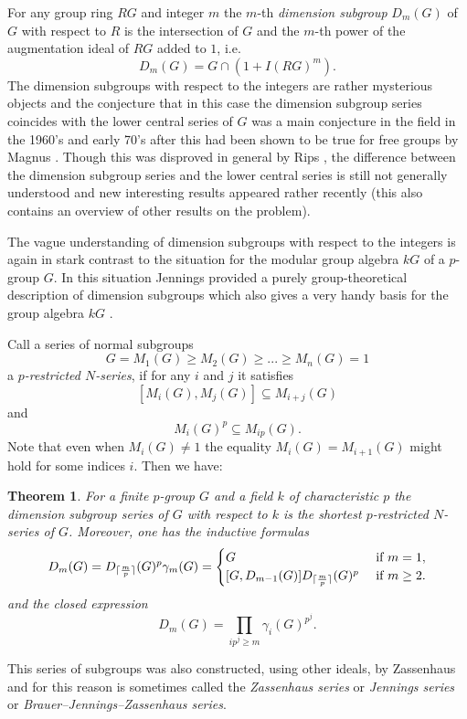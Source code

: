 \documentclass[11pt, a4paper]{amsart}
\newtheorem{theorem}{Theorem}[section]
\theoremstyle{definition}
\DeclarePairedDelimiter{\ceil}{\lceil}{\rceil}
\begin{document}
For any group ring $RG$ and integer $m$ the $m$-th \emph{dimension subgroup} $D_m(G)$ of $G$ with respect to $R$ is the intersection of $G$ and the $m$-th power of the augmentation ideal of $RG$ added to $1$, i.e.\
\[D_m(G) = G \cap (1+I(RG)^m). \]
The dimension subgroups with respect to the integers are rather mysterious objects and the conjecture that in this case the dimension subgroup series coincides with the lower central series of $G$ was a main conjecture in the field in the 1960's and early 70's after this had been shown to be true for free groups by Magnus \cite{Magnus35}. Though this was disproved in general by Rips \cite{Rips72}, the difference between the dimension subgroup series and the lower central series is still not generally understood and new interesting results appeared rather recently \cite{BartholdiMikhailov} (this also contains an overview of other results on the problem).

The vague understanding of dimension subgroups with respect to the integers is again in stark contrast to the situation for the modular group algebra $kG$ of a $p$-group $G$. In this situation Jennings provided a purely group-theoretical description of dimension subgroups which also gives a very handy basis for the group algebra $kG$ \cite{Jennings41}.

Call a series of normal subgroups
\[G = M_1(G) \geq M_2(G) \geq ... \geq M_n(G) = 1 \]
a \emph{$p$-restricted $N$-series}, if for any $i$ and $j$ it satisfies
\[[M_i(G), M_j(G)] \subseteq M_{i+j}(G) \]
and
\[M_i(G)^p \subseteq M_{ip}(G). \]
Note that even when $M_i(G) \neq 1$ the equality $M_i(G) = M_{i+1}(G)$ might hold for some indices $i$. Then we have:

\begin{theorem}\cite{Jennings41, Lazard54} 
For a finite $p$-group $G$ and a field $k$ of characteristic $p$ the dimension subgroup series of $G$ with respect to $k$ is the shortest $p$-restricted $N$-series of $G$. Moreover, one has the inductive formulas 
\[D_m(G) = D_{\ceil{\frac{m}{p}}}(G)^p \gamma_m(G) = \begin{cases}
G & \textup{ if } m=1, \\
[G,D_{m-1}(G)]D_{\ceil{\frac{m}{p}}}(G)^p & \textup{ if } m\geq 2.
\end{cases}\]
and the closed expression
\[D_m(G) = \prod_{ip^j \geq m} \gamma_i(G)^{p^j} . \]
\end{theorem}
This series of subgroups was also constructed, using other ideals, by Zassenhaus and for this reason is sometimes called the \emph{Zassenhaus series} or \emph{Jennings series} or \emph{Brauer--Jennings--Zassenhaus series}.
\end{document}
